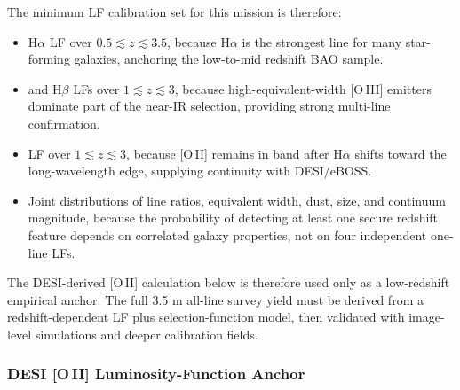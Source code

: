 \documentclass[10pt,onecolumn]{article}
\begin{document}
The minimum LF calibration set for this mission is therefore:
\begin{itemize}
  \item H$\alpha$ LF over $0.5\lesssim z\lesssim3.5$, because H$\alpha$ is the strongest line for many star-forming galaxies, anchoring the low-to-mid redshift BAO sample.
  \item [O\,III] and H$\beta$ LFs over $1\lesssim z\lesssim3$, because high-equivalent-width [O\,III] emitters dominate part of the near-IR selection, providing strong multi-line confirmation.
  \item [O\,II] LF over $1\lesssim z\lesssim3$, because [O\,II] remains in band after H$\alpha$ shifts toward the long-wavelength edge, supplying continuity with DESI/eBOSS.
  \item Joint distributions of line ratios, equivalent width, dust, size, and continuum magnitude, because the probability of detecting at least one secure redshift feature depends on correlated galaxy properties, not on four independent one-line LFs.
\end{itemize}
The DESI-derived [O\,II] calculation below is therefore used only as a low-redshift empirical anchor. The full 3.5 m all-line survey yield must be derived from a redshift-dependent LF plus selection-function model, then validated with image-level simulations and deeper calibration fields.

\subsubsection{DESI [O\,II] Luminosity-Function Anchor}
\end{document}
